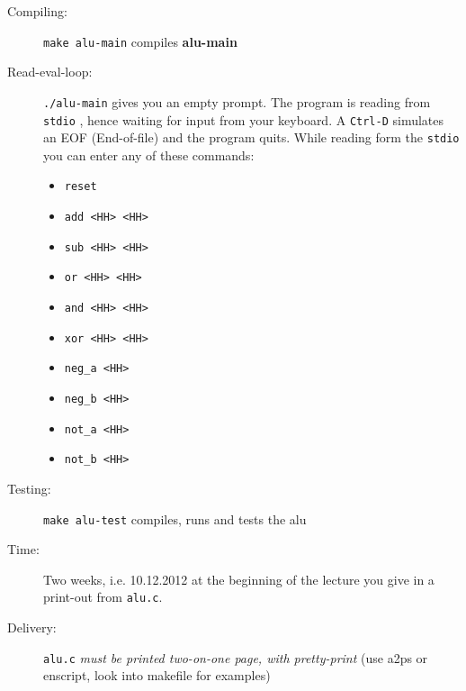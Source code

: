 \documentclass[a4paper]{article}
\begin{document}
\begin{description}
\item[Compiling:] \texttt{make alu-main} compiles \textbf{alu-main}
\item[Read-eval-loop:] \texttt{./alu-main} gives you an empty prompt. The program is reading from  \texttt{stdio} , hence waiting for input from your keyboard. A \texttt{Ctrl-D} simulates an EOF (End-of-file) and the program quits. While reading form the \texttt{stdio} you can enter any of these commands:
  \begin{itemize}
  \item \texttt{reset}
  \item \texttt{add <HH> <HH>}
  \item \texttt{sub <HH> <HH>}
  \item \texttt{or <HH> <HH>}
  \item \texttt{and <HH> <HH>}
  \item \texttt{xor <HH> <HH>}
  \item \texttt{neg\_a <HH>}
  \item \texttt{neg\_b <HH>}
  \item \texttt{not\_a <HH>}
  \item \texttt{not\_b <HH>}
  \end{itemize}
\item[Testing:] \texttt{make alu-test} compiles, runs and tests the alu
\item[Time:] Two weeks, i.e. 10.12.2012 at the beginning of the lecture you give in a print-out from \texttt{alu.c}.
\item[Delivery:] \texttt{alu.c} \emph{must be printed two-on-one page, with pretty-print} (use a2ps or enscript, look into makefile for examples)
\end{description}
\end{document}
